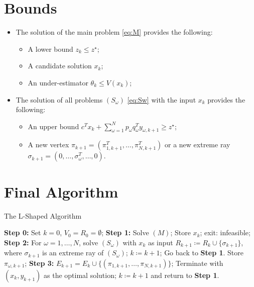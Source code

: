 \documentclass[12pt, openany]{report}
\theoremstyle{definition}
\begin{document}
\section{Bounds}
\begin{itemize}
	\item The solution of the main problem \eqref{eq:M} provides the following:
	\begin{itemize}
		\item A lower bound $z_k\le z^\star$;
		\item A candidate solution $x_k$;
		\item An under-estimator $\theta_k \le V(x_k)$;
	\end{itemize}
	\item The solution of all problems $(S_\omega)$ \eqref{eq:Sw} with the input $x_k$ provides the following:
	\begin{itemize}
		\item An upper bound $c^Tx_k + \sum_{\omega = 1}^N p_\omega q_\omega^Ty_{\omega, k+1}\ge z^\star$;
		\item A new vertex $\pi_{k+1}=(\pi^T_{1,k+1},\dots, \pi^T_{N,k+1})$ or a new extreme ray $\sigma_{k+1}=(0,\dots,\sigma_\omega^T,\dots,0)$. 
	\end{itemize}
\end{itemize}
\section{Final Algorithm}
\begin{algorithm}[H]
	\caption{The L-Shaped Algorithm}
	\label{algo:lshaped}
	\begin{algorithmic}[1]
		\State \textbf{Step 0:} Set $k=0$, $V_0 = R_0 = \emptyset$;
		\State \textbf{Step 1:} Solve $(M)$;
		 \State Store $x_k$;
		\Else \State exit: infeasible;
		\EndIf
		\State \textbf{Step 2:} For $\omega=1,\dots,N$, solve $(S_\omega)$ with $x_k$ as input
		 \State $R_{k+1}\coloneqq R_k \cup \{\sigma_{k+1}\}$, where $\sigma_{k+1}$ is an extreme ray of $(S_\omega)$;
		\State $k\coloneqq k+1$;
		\State Go back to \textbf{Step 1}.
		\Else \State Store $\pi_{\omega,k+1}$;
		\EndIf 
		\State \textbf{Step 3:} $E_{k+1} = E_k \cup \{(\pi_{1,k+1}, \dots, \pi_{N,k+1})\}$;
		 \State Terminate with $(x_k,y_{k+1})$ as the optimal solution;
		\Else \State $k\coloneqq k+1$ and return to \textbf{Step 1}.
		\EndIf 
	\end{algorithmic}
\end{algorithm}
\end{document}
